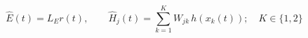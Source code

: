 \documentclass{article}
\begin{document}
\fontsize{22}{29}\selectfont
\[
\hat E(t)=L_E r(t),\qquad\hat H_j(t)=\sum_{k=1}^{K}W_{jk}\,h(x_k(t));\quad K\in\{1,2\}
\]
\end{document}
